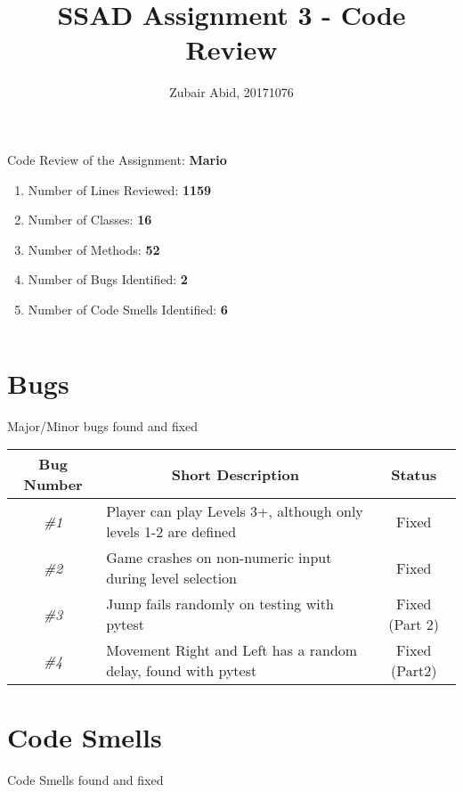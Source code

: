 \documentclass[11pt,a4paper]{article}
\title{SSAD Assignment 3 - Code Review}
\author{Zubair Abid, 20171076}
\date{}
\begin{document}
	\maketitle
	Code Review of the Assignment: \textbf{Mario}\\
    \begin{enumerate}
    	\item Number of Lines Reviewed: \textbf{1159}
    	
    	\item Number of Classes: \textbf{16}
    	
    	\item Number of Methods: \textbf{52}
    	
    	\item Number of Bugs Identified: \textbf{2}
    	
    	\item Number of Code Smells Identified: \textbf{6}
    \end{enumerate}
	$ $\\
	
	\section{Bugs}	
	Major/Minor bugs found and fixed	

	\begin{table}[H]
		\centering
		\begin{tabular}{@{}clc@{}}
			\toprule
			\textbf{Bug Number} & \multicolumn{1}{c}{\textbf{Short Description}} & \textbf{Status} \\ \midrule
			\textit{\#1} & Player can play Levels 3+,  although only levels 1-2 are defined & Fixed \\
			\textit{\#2} & Game crashes on non-numeric input during level selection & Fixed \\ 
			\textit{\#3} & Jump fails randomly on testing with pytest & Fixed (Part 2)\\
			\textit{\#4} & Movement Right and Left has a random delay, found with pytest & Fixed (Part2)\\ \bottomrule
		\end{tabular}
	\end{table}

	\section{Code Smells}
	Code Smells found and fixed	
		
\end{document}
